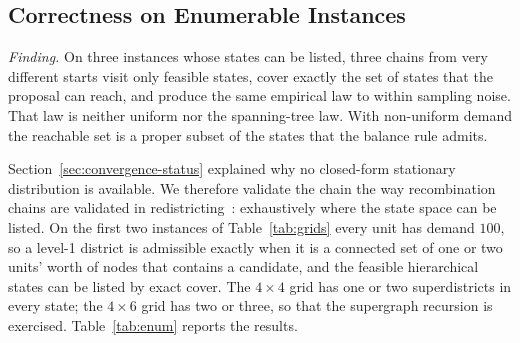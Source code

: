 \documentclass[11pt]{article}
\theoremstyle{definition}
\begin{document}
\subsection{Correctness on Enumerable Instances}
\label{sec:exp-convergence}\label{sec:exp-enumeration}

\emph{Finding.} On three instances whose states can be listed, three chains from very different starts visit only feasible states, cover exactly the set of states that the proposal can reach, and produce the same empirical law to within sampling noise. That law is neither uniform nor the spanning-tree law. With non-uniform demand the reachable set is a proper subset of the states that the balance rule admits.

Section~\ref{sec:convergence-status} explained why no closed-form stationary distribution is available. We therefore validate the chain the way recombination chains are validated in redistricting~\citep{fifield2020essential,cannon2026spanning}: exhaustively where the state space can be listed. On the first two instances of Table~\ref{tab:grids} every unit has demand $100$, so a level-1 district is admissible exactly when it is a connected set of one or two units' worth of nodes that contains a candidate, and the feasible hierarchical states can be listed by exact cover. The $4\times4$ grid has one or two superdistricts in every state; the $4\times6$ grid has two or three, so that the supergraph recursion is exercised. Table~\ref{tab:enum} reports the results.

\begin{table}[!htbp]
\centering
\footnotesize\setlength{\tabcolsep}{3.5pt}
\resizebox{\linewidth}{!}{}
\caption{Exact enumeration. On the two grids with demand $100$ the feasible states are those that satisfy the rules of Section~\ref{sec:rules}; on the grid with demands $80$ to $120$ they are the states the proposal can reach, computed by closing its move rules, out of $3{,}087$ level-1 states that the balance rule admits. ``Unvisited'' is the number of feasible level-1 states that no chain visited, with the number an independent sample of the same total length from the pooled law would leave unvisited in parentheses. The total-variation (TV) distances are the largest over pairs of chains for the level-1 law and the joint (level-1, level-2) law, and the largest over chains between the two halves of one chain; each is followed in parentheses by its noise floor, the distance expected between two independent samples of the same size from the pooled law. The last three columns describe the pooled level-1 law: its distance to the uniform law and to the spanning-tree law, and the ratio of the largest to the smallest sampled frequency.}
\label{tab:enum}
\end{table}
\end{document}
